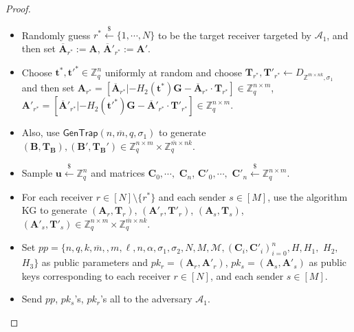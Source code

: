 \documentclass[a4paper,11pt,onecolumn]{elsarticle}
\def\bf{\mathbf}
\begin{document}
\begin{proof}
\begin{description}
\begin{itemize}
			  	\item Randomly guess $r^* \xleftarrow{\$} \{1, \cdots, N\}$ to be the target receiver targeted by $\mathcal{A}_1$, and then set $\overline{\mathbf{A}}_{r^*}:=\textbf{A}$, $\overline{\mathbf{A}}'_{r^*}:=\textbf{A}'$. 
			  	\item Choose $\textbf{t}^*, \textbf{t}'^*\in \mathbb{Z}_q^n$ uniformly at random and choose $ \mathbf{T}_{r^*}, \mathbf{T}'_{r^*} \leftarrow D_{\mathbb{Z}^{\overline{m} \times n k }, \sigma_1} $ and then set $\mathbf{A}_{r^*}=[\overline{\mathbf{A}}_{r^*}|-H_2(\textbf{t}^*)\mathbf{G}-\overline{\mathbf{A}}_{r^*}\cdot \mathbf{T}_{r^*}] \in \mathbb{Z}_q^{n \times m}$, $\mathbf{A}'_{r^*}=[\overline{\mathbf{A}}'_{r^*}|-H_2(\textbf{t}'^*)\mathbf{G}-\overline{\mathbf{A}}'_{r^*}\cdot \mathbf{T}'_{r^*}] \in \mathbb{Z}_q^{n \times m}$.
			  	\item Also, use $\textsf{GenTrap}(n, \overline{m},q, \sigma_1)$ to generate  $(\mathbf{B}, \mathbf{T}_{\textbf{B}}), (\mathbf{B}', \mathbf{T}_{\textbf{B}}') \in  \mathbb{Z}_q^{n \times m} \times \mathbb{Z}_q^{\overline{m} \times nk}$.
			  	\item Sample $ \mathbf{u} \xleftarrow{\$} \mathbb{Z}_q ^{n}$ and  matrices $\mathbf{C}_0, \cdots,$ $ \mathbf{C}_{n}$, $\mathbf{C}'_0, \cdots,$ $ \mathbf{C}'_{n} \xleftarrow{\$} \mathbb{Z}_q^{n \times m}$.
			  	\item For each receiver $r \in [N]\setminus \{r^*\}$ and each sender $s\in [M]$, use the algorithm \textsf{KG} to generate  $(\mathbf{A}_r, \mathbf{T}_r)$, $ (\mathbf{A}'_r, \mathbf{T}'_r)$, $(\mathbf{A}_s, \mathbf{T}_s)$, $(\mathbf{A}'_s, \mathbf{T}'_s) \in  \mathbb{Z}_q^{n \times m} \times \mathbb{Z}_q^{\overline{m} \times n k}$.
			  	
			  	
			  	\item Set $pp=\{n, q, k,  \overline{m},, m,\ell, n, \alpha, \sigma_1,  \sigma_2, N, M,  \mathcal{M}, (\bf{C}_i, \bf{C}'_i)_{i=0}^{n}, H, H_1,$ $ H_2, $ $H_3\}$ as public parameters and  $pk_{r}=(\mathbf{A}_r, \mathbf{A}'_r)$, $pk_{s}=(\mathbf{A}_s, \mathbf{A}'_s)$ as public keys corresponding to each receiver $r \in [N]$, and each sender $s\in [M]$.
			  	\item Send $pp$, $pk_s$'s, $pk_r$'s all to the adversary  $\mathcal{A}_1$.
			  \end{itemize}
			 

\end{description}
\end{proof}
\end{document}

